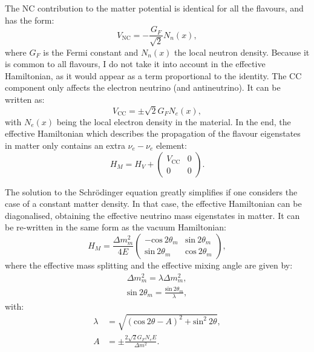 The NC contribution to the matter potential is identical for all the flavours, and has the form:
\begin{equation}
	V_{\mathrm{NC}} = -\frac{G_{F}}{\sqrt{2}} N_{n}(x),
\end{equation}
where $G_{F}$ is the Fermi constant and $N_{n}(x)$ the local neutron density. Because it is common to all flavours, I do not take it into account in the effective Hamiltonian, as it would appear as a term proportional to the identity. The CC component only affects the electron neutrino (and antineutrino). It can be written as:
\begin{equation}
	V_{\mathrm{CC}} = \pm \sqrt{2} G_{F} N_{e}(x),
\end{equation}
with $N_{e}(x)$ being the local electron density in the material. In the end, the effective Hamiltonian which describes the propagation of the flavour eigenstates in matter only contains an extra $\nu_{e}-\nu_{e}$ element:
\begin{equation}
	H_{M} = H_{V} + \begin{pmatrix}V_{\mathrm{CC}}&0\\0&0\end{pmatrix}.
\end{equation}

The solution to the Schrödinger equation greatly simplifies if one considers the case of a constant matter density. In that case, the effective Hamiltonian can be diagonalised, obtaining the effective neutrino mass eigenstates in matter. It can be re-written in the same form as the vacuum Hamiltonian:
\begin{equation}
	H_{M} = \frac{\Delta m_{m}^{2}}{4E} \begin{pmatrix}-\mathrm{cos}~2\theta_{m}&\mathrm{sin}~2\theta_{m}\\\mathrm{sin}~2\theta_{m}&\mathrm{cos}~2\theta_{m}\end{pmatrix},
\end{equation}
where the effective mass splitting and the effective mixing angle are given by:
\begin{equation}
	\begin{split}
		\Delta m_{m}^{2} = \lambda \Delta m_{m}^{2},\\
		\mathrm{sin}~2\theta_{m} = \frac{\mathrm{sin}~2\theta_{m}}{\lambda},
	\end{split}
\end{equation}
with:
\begin{equation}
	\begin{split}
		\lambda &= \sqrt{(\mathrm{cos}~2\theta - A)^{2} + \mathrm{sin}^{2}~2\theta},\\
		A &= \pm \frac{2\sqrt{2}G_{F}N_{e}E}{\Delta m^{2}}.
	\end{split}
\end{equation}

